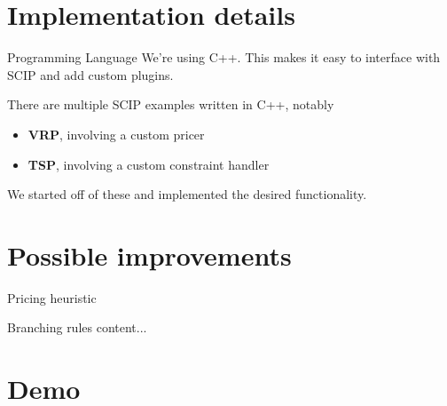 \documentclass[fleqn]{beamer}
\begin{document}
	\section{Implementation details}
    \begin{frame}{Programming Language}
        We're using C++.
        This makes it easy to interface with SCIP and add custom plugins.
        
        There are multiple SCIP examples written in C++, notably
        \begin{itemize}
            \item \textbf{VRP}, involving a custom pricer %
            \item \textbf{TSP}, involving a custom constraint handler %
        \end{itemize}
        We started off of these and implemented the desired functionality.
    \end{frame}
    
	\section{Possible improvements}
    \begin{frame}{Pricing heuristic}
        
    \end{frame}

    \begin{frame}{Branching rules}
        content...
    \end{frame}
    
    \section{Demo}
\end{document}
